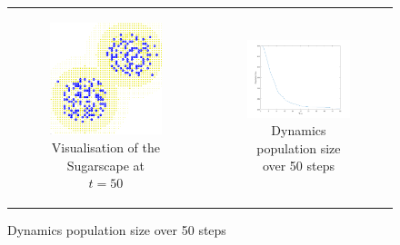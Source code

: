 \documentclass{bmcart}
\begin{document}
\begin{backmatter}
\begin{figure}[h!]
\begin{center}
	\begin{tabular}{c c}
		\begin{subfigure}[b]{0.4\textwidth}
			\centering
			\includegraphics[width=1\textwidth, angle=0]{./sugarscape_t60_environment.png}
			\caption{Visualisation of the Sugarscape at $t = 50$}
			\label{fig:vis_sugarscape_t50_environment}
		\end{subfigure}
    	
    	&
  
		\begin{subfigure}[b]{0.6\textwidth}
			\centering
			\includegraphics[width=1\textwidth, angle=0]{./sugarscape_t60_dynamics.png}
			\caption{Dynamics population size over 50 steps}
			\label{fig:vis_sugarscape_t50_dynamics}
		\end{subfigure}
	\end{tabular}
	

\end{center}
\end{figure}
\end{backmatter}
\end{document}
